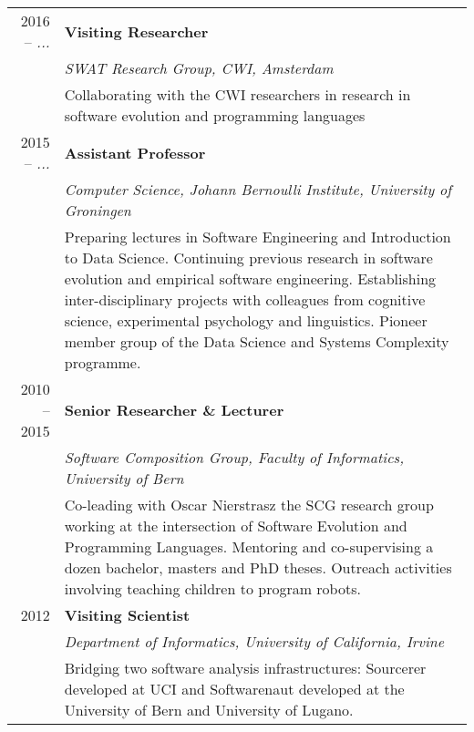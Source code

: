 
\newcommand{\job}[4]
	{#1 & %

	{\bf #3}\\ & %

	{\em #2} \vspace{0.2em} \\ & %


	{#4} \vspace{1em} \\} %

\begin{tabular}{r p{12cm}}

	\job 
	{2016 -- {\em ...}}
	{SWAT Research Group, CWI, Amsterdam}
	{Visiting Researcher}
	{Collaborating with the CWI researchers in research in software evolution and programming languages}


	\job
	{2015 -- {\em ...}}
	{Computer Science, Johann Bernoulli Institute, University of Groningen}
	{
	Assistant Professor}
	{Preparing lectures in Software Engineering and Introduction to Data Science. Continuing previous research in software evolution and empirical software engineering. Establishing inter-disciplinary projects with colleagues from cognitive science, experimental psychology and linguistics. Pioneer member group of the Data Science and Systems Complexity programme.}



	\job
	{2010 -- 2015}
	{Software Composition Group, Faculty of Informatics, University of Bern}
	{Senior Researcher \& Lecturer}
	{
	Co-leading with Oscar Nierstrasz the SCG research group working at the intersection of Software Evolution and Programming Languages. Mentoring and co-supervising a dozen bachelor, masters and PhD theses. Outreach activities involving teaching children to program robots.}

	\job
	{2012}
	{Department of Informatics, University of California, Irvine}
	{Visiting Scientist}
	{
	Bridging two software analysis infrastructures: Sourcerer developed at UCI and Softwarenaut developed at the University of Bern and University of Lugano. 
	}



\end{tabular}
